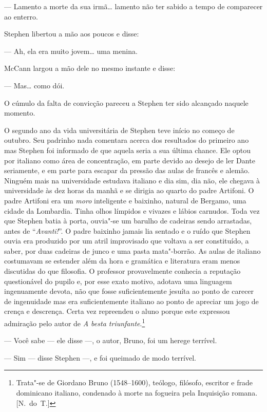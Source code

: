 --- Lamento a morte da sua irmã\ldots{} lamento não ter sabido a tempo de comparecer
ao enterro.

Stephen libertou a mão aos poucos e disse:

--- Ah, ela era muito jovem\ldots{} uma menina.

McCann largou a mão dele no mesmo instante e disse:

--- Mas\ldots{} como dói.

O cúmulo da falta de convicção pareceu a Stephen ter sido alcançado naquele
momento.

O segundo ano da vida universitária de Stephen teve início no começo de
outubro.  Seu padrinho nada comentara acerca dos resultados do primeiro ano mas
Stephen foi informado de que aquela seria a sua última chance.  Ele optou por
italiano como área de concentração, em parte devido ao desejo de ler Dante
seriamente, e em parte para escapar da pressão das aulas de francês e alemão.
Ninguém mais na universidade estudava italiano e dia sim, dia não, ele chegava
à universidade às dez horas da manhã e se dirigia ao quarto do padre Artifoni.
O padre Artifoni era um \textit{moro} inteligente e baixinho, natural de		
Bergamo, uma cidade da Lombardia.  Tinha olhos límpidos e vivazes e lábios
carnudos.  Toda vez que Stephen batia à porta, ouvia"-se um barulho de
cadeiras sendo arrastadas, antes de “\textit{Avanti!}”.  O padre baixinho
jamais lia sentado e o ruído que Stephen ouvia era produzido por um atril
improvisado que voltava a ser constituído, a saber, por duas cadeiras de junco		
e uma pasta mata"-borrão.  As aulas de italiano costumavam se estender além da		
hora e gramática e literatura eram menos discutidas do que filosofia.  O
professor provavelmente conhecia a reputação questionável do pupilo e, por esse
exato motivo, adotava uma linguagem ingenuamente devota, não que fosse
suficientemente jesuíta ao ponto de carecer de ingenuidade mas era
suficientemente italiano ao ponto de apreciar um jogo de crença e descrença.
Certa vez repreendeu o aluno porque este expressou admiração pelo autor de
\textit{A besta triunfante}.\footnote[\setcounter{symbol}{1}]{ Trata"-se de Giordano Bruno (1548--1600),
teólogo, filósofo, escritor e frade dominicano italiano, condenado à morte na
fogueira pela Inquisição romana. [N.~do~T.]}

--- Você sabe --- ele disse ---, o autor, Bruno, foi um herege terrível.

--- Sim --- disse Stephen ---, e foi queimado de modo terrível.

